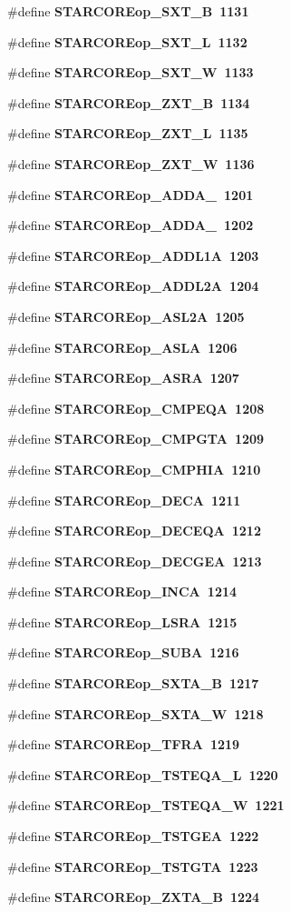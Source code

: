 \begin{CompactItemize}
\#define \bf{STARCOREop\_\-SXT\_\-B}~1131
\item 
\#define \bf{STARCOREop\_\-SXT\_\-L}~1132
\item 
\#define \bf{STARCOREop\_\-SXT\_\-W}~1133
\item 
\#define \bf{STARCOREop\_\-ZXT\_\-B}~1134
\item 
\#define \bf{STARCOREop\_\-ZXT\_\-L}~1135
\item 
\#define \bf{STARCOREop\_\-ZXT\_\-W}~1136
\item 
\#define \bf{STARCOREop\_\-ADDA\_}~1201
\item 
\#define \bf{STARCOREop\_\-ADDA\_}~1202
\item 
\#define \bf{STARCOREop\_\-ADDL1A}~1203
\item 
\#define \bf{STARCOREop\_\-ADDL2A}~1204
\item 
\#define \bf{STARCOREop\_\-ASL2A}~1205
\item 
\#define \bf{STARCOREop\_\-ASLA}~1206
\item 
\#define \bf{STARCOREop\_\-ASRA}~1207
\item 
\#define \bf{STARCOREop\_\-CMPEQA}~1208
\item 
\#define \bf{STARCOREop\_\-CMPGTA}~1209
\item 
\#define \bf{STARCOREop\_\-CMPHIA}~1210
\item 
\#define \bf{STARCOREop\_\-DECA}~1211
\item 
\#define \bf{STARCOREop\_\-DECEQA}~1212
\item 
\#define \bf{STARCOREop\_\-DECGEA}~1213
\item 
\#define \bf{STARCOREop\_\-INCA}~1214
\item 
\#define \bf{STARCOREop\_\-LSRA}~1215
\item 
\#define \bf{STARCOREop\_\-SUBA}~1216
\item 
\#define \bf{STARCOREop\_\-SXTA\_\-B}~1217
\item 
\#define \bf{STARCOREop\_\-SXTA\_\-W}~1218
\item 
\#define \bf{STARCOREop\_\-TFRA}~1219
\item 
\#define \bf{STARCOREop\_\-TSTEQA\_\-L}~1220
\item 
\#define \bf{STARCOREop\_\-TSTEQA\_\-W}~1221
\item 
\#define \bf{STARCOREop\_\-TSTGEA}~1222
\item 
\#define \bf{STARCOREop\_\-TSTGTA}~1223
\item 
\#define \bf{STARCOREop\_\-ZXTA\_\-B}~1224
\item 

\end{CompactItemize}
